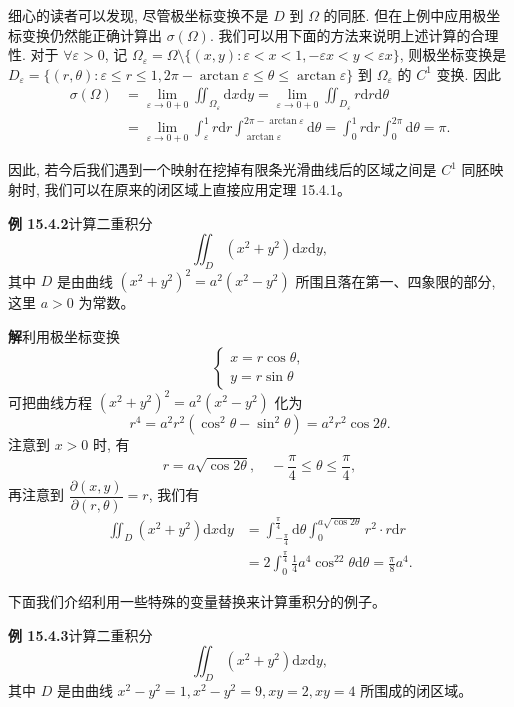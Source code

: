 \documentclass[UTF8,12pt,a4paper,fontset=fandol]{ctexart}
\begin{document}
细心的读者可以发现, 尽管极坐标变换不是 $D$ 到 $\Omega$ 的同胚. 但在上例中应用极坐标变换仍然能正确计算出 $\sigma(\Omega)$. 我们可以用下面的方法来说明上述计算的合理性. 对于 $\forall\varepsilon>0$, 记 $\Omega_\varepsilon=\Omega\setminus\{(x,y):\varepsilon<x<1,-\varepsilon x<y<\varepsilon x\}$, 则极坐标变换是 $D_\varepsilon=\{(r,\theta):\varepsilon\leqslant r\leqslant1,2\pi-\arctan\varepsilon\leqslant\theta\leqslant\arctan\varepsilon\}$ 到 $\Omega_\varepsilon$ 的 $C^1$ 变换. 因此
\[
\begin{aligned}
  \sigma(\Omega)
  &=\lim_{\varepsilon\to0+0}\iint_{\Omega_\varepsilon}\mathrm dx\mathrm dy
  =\lim_{\varepsilon\to0+0}\iint_{D_\varepsilon}r\mathrm dr\mathrm d\theta\\
  &=\lim_{\varepsilon\to0+0}\int_\varepsilon^1 r\mathrm dr
  \int_{\arctan\varepsilon}^{2\pi-\arctan\varepsilon}\mathrm d\theta
  =\int_0^1 r\mathrm dr\int_0^{2\pi}\mathrm d\theta=\pi.
\end{aligned}
\]

因此, 若今后我们遇到一个映射在挖掉有限条光滑曲线后的区域之间是 $C^1$ 同胚映射时, 我们可以在原来的闭区域上直接应用定理 15.4.1。

\noindent\textbf{例 15.4.2}\quad 计算二重积分
\[
  \iint_D(x^2+y^2)\mathrm dx\mathrm dy,
\]
其中 $D$ 是由曲线 $(x^2+y^2)^2=a^2(x^2-y^2)$ 所围且落在第一、四象限的部分, 这里 $a>0$ 为常数。

\noindent\textbf{解}\quad 利用极坐标变换
\[
  \begin{cases}
    x=r\cos\theta,\\
    y=r\sin\theta
  \end{cases}
\]
可把曲线方程 $(x^2+y^2)^2=a^2(x^2-y^2)$ 化为
\[
  r^4=a^2r^2(\cos^2\theta-\sin^2\theta)=a^2r^2\cos2\theta.
\]
注意到 $x>0$ 时, 有
\[
  r=a\sqrt{\cos2\theta},\quad -\frac\pi4\leqslant\theta\leqslant\frac\pi4,
\]
再注意到 $\dfrac{\partial(x,y)}{\partial(r,\theta)}=r$, 我们有
\[
\begin{aligned}
  \iint_D(x^2+y^2)\mathrm dx\mathrm dy
  &=\int_{-\frac\pi4}^{\frac\pi4}\mathrm d\theta
  \int_0^{a\sqrt{\cos2\theta}}r^2\cdot r\mathrm dr\\
  &=2\int_0^{\frac\pi4}\frac14a^4\cos^22\theta\mathrm d\theta
  =\frac\pi8a^4.
\end{aligned}
\]

下面我们介绍利用一些特殊的变量替换来计算重积分的例子。

\noindent\textbf{例 15.4.3}\quad 计算二重积分
\[
  \iint_D(x^2+y^2)\mathrm dx\mathrm dy,
\]
其中 $D$ 是由曲线 $x^2-y^2=1,x^2-y^2=9,xy=2,xy=4$ 所围成的闭区域。
\end{document}
